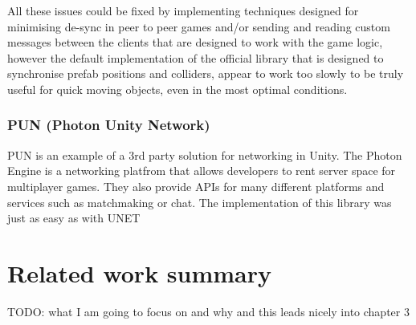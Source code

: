 All these issues could be fixed by implementing techniques designed for minimising de-sync in peer to peer games and/or sending and reading custom messages between the clients that are designed to work with the game logic, however the default implementation of the official library that is designed to synchronise prefab positions and colliders, appear to work too slowly to be truly useful for quick moving objects, even in the most optimal conditions.


\newpage

\subsubsection{PUN (Photon Unity Network)}
PUN is an example of a 3rd party solution for networking in Unity. The Photon Engine is a networking platfrom that allows developers to rent server space for multiplayer games. They also provide APIs for many different platforms and services such as matchmaking or chat. The implementation of this library was just as easy as with UNET


\section{Related work summary}
TODO: what I am going to focus on and why and this leads nicely into chapter 3
